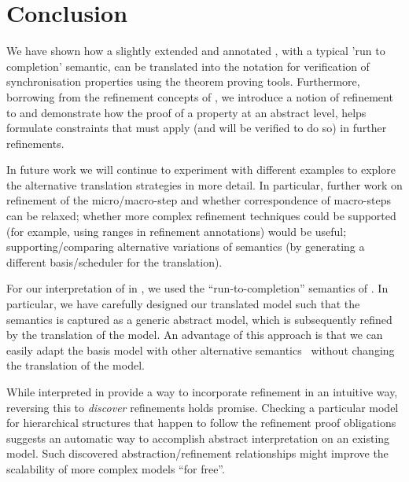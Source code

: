 
\section{Conclusion}
\label{sec:conclusion}
We have shown how a slightly extended and annotated \startchart, with a typical 'run to completion' semantic, can be translated into the \EventB notation for verification of synchronisation properties using the \EventB theorem proving tools.
Furthermore, borrowing from the refinement concepts of \EventB, we introduce a notion of refinement to \statecharts and demonstrate how the proof of a property at an abstract level, helps formulate constraints that must apply (and will be verified to do so) in further refinements.

In future work we will continue to experiment with different examples to explore the alternative translation strategies in more detail. 
In particular, further work on refinement of the micro/macro-step and whether correspondence of macro-steps can be relaxed; whether more complex refinement techniques could be supported (for example, using ranges in refinement annotations) would be useful; supporting/comparing alternative variations of semantics (by generating a different basis/scheduler for the translation).

For our interpretation of \statecharts in \mbox{\iUMLB}, we used the ``run-to-completion'' semantics of \statecharts.  In particular, we have carefully designed our translated model such that the semantics is captured as a generic abstract model, which is subsequently refined by the translation of the \SCXML model.  An advantage of this approach is that we can easily adapt the basis model with other alternative semantics~\mbox{\cite{Eshuis_2009}} without changing the translation of the \SCXML model. 

While \statecharts interpreted in \iUMLB provide a way to incorporate refinement in an intuitive way, reversing this to \emph{discover} refinements holds promise. 
Checking a particular \statechart model for hierarchical structures that happen to follow the refinement proof obligations suggests an automatic way to accomplish abstract interpretation on an existing model.  
Such discovered abstraction/refinement relationships might improve the scalability of more complex \statechart models ``for free''.
